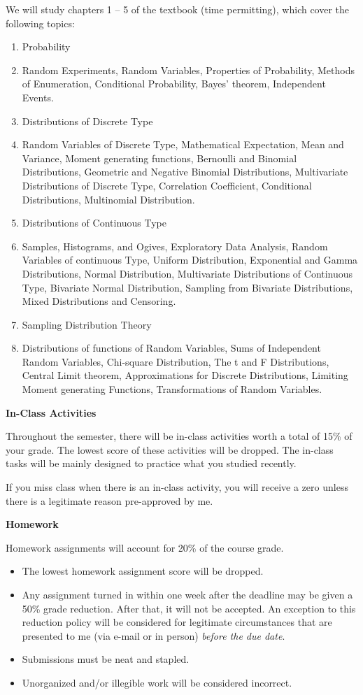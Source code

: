 \documentclass{article}
\begin{document}
We will study chapters 1 -- 5 of the textbook (time permitting), which cover the following topics:
\begin{enumerate}
    \item Probability
    \item[] Random Experiments, Random Variables, Properties of Probability, Methods of Enumeration, Conditional Probability, Bayes' theorem, Independent Events.
    \item Distributions of Discrete Type
    \item[] Random Variables of Discrete Type, Mathematical Expectation, Mean and Variance, Moment generating functions, Bernoulli and Binomial Distributions, Geometric and Negative Binomial Distributions, Multivariate Distributions of Discrete Type, Correlation Coefficient, Conditional Distributions, Multinomial Distribution.
    \item Distributions of Continuous Type
    \item[] Samples, Histograms, and Ogives, Exploratory Data Analysis, Random Variables of continuous Type, Uniform Distribution, Exponential and Gamma Distributions, Normal Distribution, Multivariate Distributions of Continuous Type, Bivariate Normal Distribution, Sampling from Bivariate Distributions, Mixed Distributions and Censoring.
    \item Sampling Distribution Theory
    \item[] Distributions of functions of Random Variables, Sums of Independent Random Variables, Chi-square Distribution, The t and F Distributions, Central Limit theorem, Approximations for Discrete Distributions, Limiting Moment generating Functions, Transformations of Random Variables.
\end{enumerate}\bigskip

\textbf{\large In-Class Activities}\medskip

Throughout the semester, there will be in-class activities worth a total of 15\% of your grade. The lowest score of these activities will be dropped. The in-class tasks will be mainly designed to practice what you studied recently.

If you miss class when there is an in-class activity, you will receive a zero unless there is a legitimate reason pre-approved by me.\bigskip

\textbf{\large Homework}\medskip

Homework assignments will account for 20\% of the course grade.\medskip
\begin{itemize}
    \item The lowest homework assignment score will be dropped.
    \item Any assignment turned in within one week after the deadline may be given a 50\% grade reduction. After that, it will not be accepted. An exception to this reduction policy will be considered for legitimate circumstances that are presented to me (via e-mail or in person) \textit{before the due date}. 
    \item Submissions must be neat and stapled.
    \item Unorganized and/or illegible work will be considered incorrect.
\end{itemize}\medskip
\end{document}
